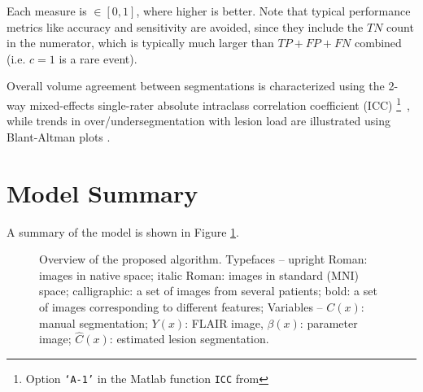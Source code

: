 Each measure is $\in [0,1]$, where higher is better. Note that typical performance metrics like accuracy and sensitivity are avoided, since they include the $TN$ count in the numerator, which is typically much larger than $TP + FP + FN$ combined (i.e. $c=1$ is a rare event).
\par
Overall volume agreement between segmentations is characterized using the 2-way mixed-effects single-rater absolute intraclass correlation coefficient (ICC)%
\footnote{Option \texttt{`A-1'} in the Matlab function \texttt{ICC} from }\ 
\cite{Koo2016}, while trends in over/undersegmentation with lesion load are illustrated using Blant-Altman plots \cite{Altman1983}.
\section{Model Summary}



A summary of the model is shown in Figure \ref{fig:modelsum}.
\begin{figure}
  \centering\scalebox{0.65}{}
  \caption{Overview of the proposed algorithm. Typefaces -- upright Roman: images in native space; italic Roman: images in standard (MNI) space; calligraphic: a set of images from several patients; bold: a set of images corresponding to different features; Variables -- $C(x)$: manual segmentation; $Y(x)$: FLAIR image, $\beta(x)$: parameter image; $\hat{C}(x)$: estimated lesion segmentation.}
  \label{fig:modelsum}
\end{figure}
